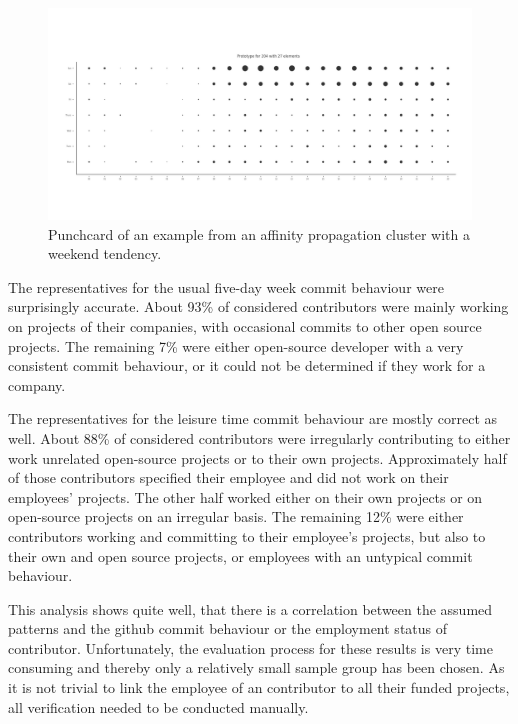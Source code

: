 \begin{figure}[H]
    \includegraphics[scale=0.32]{./graphs/analysis-affinity/204}
    \centering
    \caption{Punchcard of an example from an affinity propagation cluster with a weekend tendency.}\label{fig:random-sleep-rhythm}
\end{figure}

The representatives for the usual five-day week commit behaviour were surprisingly accurate.
About 93\% of considered contributors were mainly working on projects of their companies, with occasional commits to other open source projects.
The remaining 7\% were either open-source developer with a very consistent commit behaviour, or it could not be determined if they work for a company.



The representatives for the leisure time commit behaviour are mostly correct as well.
About 88\% of considered contributors were irregularly contributing to either work unrelated open-source projects or to their own projects.
Approximately half of those contributors specified their employee and did not work on their employees' projects.
The other half worked either on their own projects or on open-source projects on an irregular basis.
The remaining 12\% were either contributors working and committing to their employee's projects, but also to their own and open source projects, or employees with an untypical commit behaviour.


This analysis shows quite well, that there is a correlation between the assumed patterns and the github commit behaviour or the employment status of contributor.
Unfortunately, the evaluation process for these results is very time consuming and thereby only a relatively small sample group has been chosen.
As it is not trivial to link the employee of an contributor to all their funded projects, all verification needed to be conducted manually.

